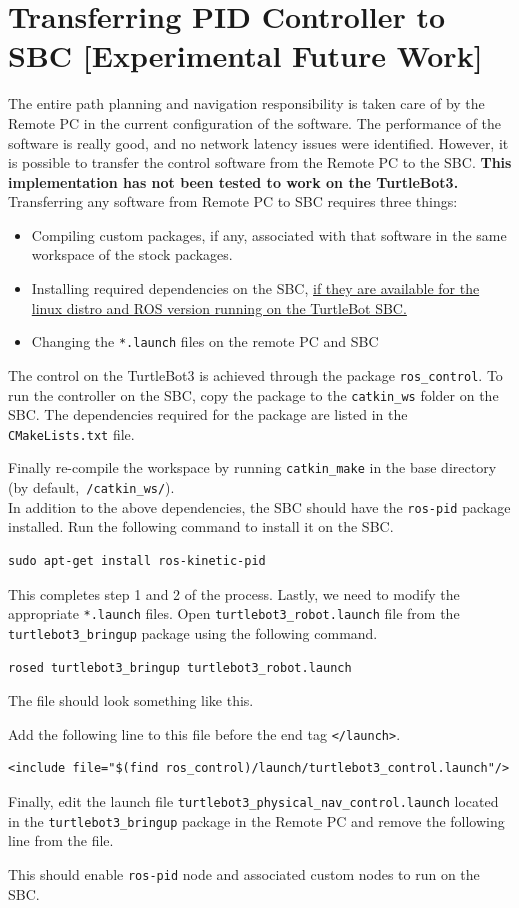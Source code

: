 \documentclass[12]{article}
\begin{document}
\section{Transferring PID Controller to SBC [Experimental Future Work]}
The entire path planning and navigation responsibility is taken care of by the Remote PC in the current configuration of the software. The performance of the software is really good, and no network latency issues were identified. However, it is possible to transfer the control software from the Remote PC to the SBC. \textbf{This implementation has not been tested to work on the TurtleBot3.} Transferring any software from Remote PC to SBC requires three things:
\begin{itemize}
	\item{Compiling custom packages, if any, associated with that software in the same workspace of the stock packages.}	
	\item{Installing required dependencies on the SBC, \ul{if they are available for the linux distro and ROS version running on the TurtleBot SBC.}}
	\item{Changing the \texttt{*.launch} files on the remote PC and SBC}
\end{itemize}
The control on the TurtleBot3 is achieved through the package \texttt{ros\_control}. To run the controller on the SBC, copy the package to the \texttt{catkin\_ws} folder on the SBC. The dependencies required for the package are listed  in the \texttt{CMakeLists.txt} file.

Finally re-compile the workspace by running \texttt{catkin\_make} in the base directory (by default,\texttt{~/catkin\_ws/}).\\
In addition to the above dependencies, the SBC should have the \texttt{ros-pid} package installed. Run the following command to install it on the SBC.
\begin{lstlisting}[style=bash]
sudo apt-get install ros-kinetic-pid
\end{lstlisting}
This completes step 1 and 2 of the process. Lastly, we need to modify the appropriate \texttt{*.launch} files. Open \texttt{turtlebot3\_robot.launch} file from the \texttt{turtlebot3\_bringup} package using the following command.
\begin{lstlisting}[style=bash]
rosed turtlebot3_bringup turtlebot3_robot.launch
\end{lstlisting}
The file should look something like this.

Add the following line to this file before the end tag \texttt{</launch>}.
\begin{lstlisting}[style=XML]
<include file="$(find ros_control)/launch/turtlebot3_control.launch"/>
\end{lstlisting}
Finally, edit the launch file \texttt{turtlebot3\_physical\_nav\_control.launch} located in the \texttt{turtlebot3\_bringup} package in the Remote PC and remove the following line from the file.

This should enable \texttt{ros-pid} node and associated custom nodes to run on the SBC.
\end{document}
